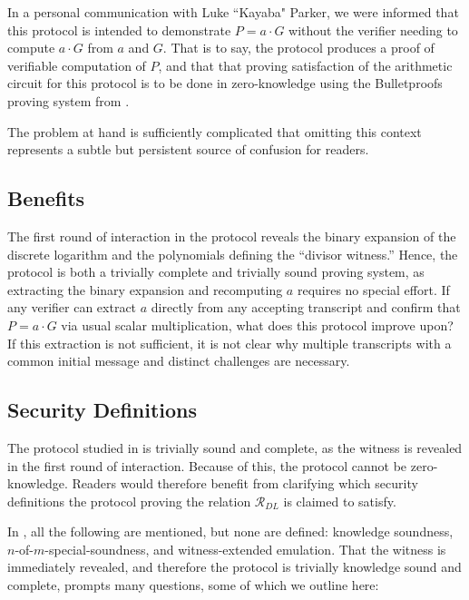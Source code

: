 \documentclass{article}
\theoremstyle{definition}
\newcommand{\6}{\mathbf}
\newcommand{\7}{\mathcal}
\begin{document}
In a personal communication with Luke ``Kayaba" Parker, we were informed that this protocol is intended to demonstrate $P = a \cdot G$ without the verifier needing to compute $a \cdot G$ from $a$ and $G$. That is to say, the protocol produces a proof of verifiable computation of $P$, and that that proving satisfaction of the arithmetic circuit for this protocol is to be done in zero-knowledge using the Bulletproofs proving system from \cite{Bullet}. 
\smallskip

The problem at hand is sufficiently complicated that omitting this context represents a subtle but persistent source of confusion for readers.

\subsection{Benefits}\label{sec:benefits}

The first round of interaction in the protocol reveals the binary expansion of the discrete logarithm and the polynomials defining the ``divisor witness.'' Hence, the protocol is both a trivially complete and trivially sound proving system, as extracting the binary expansion and recomputing $a$ requires no special effort. If any verifier can extract $a$ directly from any accepting transcript and confirm that $P=a \cdot G$ via usual scalar multiplication, what does this protocol improve upon? If this extraction is not sufficient, it is not clear why multiple transcripts with a common initial message and distinct challenges are necessary.

\subsection{Security Definitions}\label{sec:sec_def}


The protocol studied in \cite{BassaSoundnessIPDL} is trivially sound and complete, as the witness is revealed in the first round of interaction. Because of this, the protocol cannot be zero-knowledge. Readers would therefore benefit from clarifying which security definitions the protocol proving the relation $\mathcal{R}_{DL}$ is claimed to satisfy. 
\smallskip

In \cite{BassaSoundnessIPDL}, all the following are mentioned, but none are defined: knowledge soundness, $n$-of-$m$-special-soundness, and witness-extended emulation. 
That the witness is immediately revealed, and therefore the protocol is trivially knowledge sound and complete, prompts many questions, some of which we outline here: 
\end{document}
